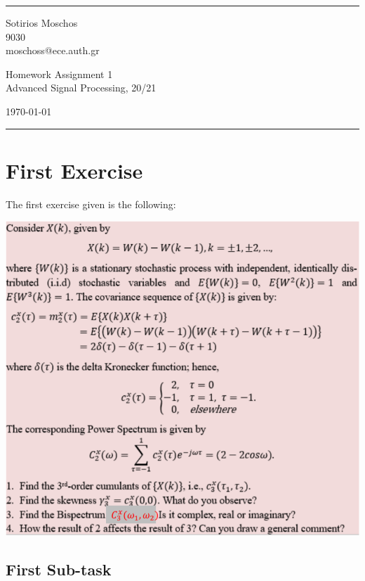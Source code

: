 \documentclass[a4paper]{article}
\begin{document}

\fancyhead[C]{}
\hrule \medskip %
\begin{minipage}{0.295\textwidth}
\raggedright
\footnotesize
Sotirios Moschos \hfill\\
9030\hfill\\
moschoss@ece.auth.gr
\end{minipage}
\begin{minipage}{0.4\textwidth}
\centering
\large
Homework Assignment 1\\
\normalsize
Advanced Signal Processing, 20/21\\
\end{minipage}
\begin{minipage}{0.295\textwidth}
\raggedleft
\today\hfill\\
\end{minipage}
\medskip\hrule
\bigskip


\section{First Exercise}
The first exercise given is the following:

\includegraphics{Images/ASP_HW1.PNG}

\subsection{First Sub-task}
\end{document}
